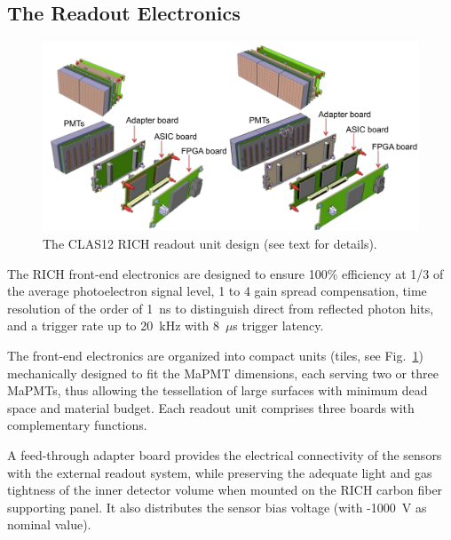 \documentclass[5p,times,twocolumn]{elsarticle}
\begin{document}
\subsection{The Readout Electronics}

\begin{figure}[t]
\begin{center}
\includegraphics[width=1.00\columnwidth]{TileAssembly.pdf}
\end{center}
\caption{The CLAS12 RICH readout unit design (see text for details).}
\label{fig:EleTile}
\end{figure}

The RICH front-end electronics are designed to ensure 100\% efficiency at 1/3 of the average photoelectron signal
level, 1 to 4 gain spread compensation, time resolution of the order of 1~ns to distinguish direct from reflected photon
hits, and a trigger rate up to 20~kHz with 8~$\mu$s trigger latency.

The front-end electronics are organized into compact units (tiles, see Fig.~\ref{fig:EleTile}) mechanically designed to
fit the MaPMT dimensions, each serving two or three MaPMTs, thus allowing the tessellation of large surfaces with
minimum dead space and material budget. Each readout unit comprises three boards with complementary functions.

A feed-through adapter board provides the electrical connectivity of the sensors with the external readout
system, while preserving the adequate light and gas tightness of the inner detector volume when mounted on the RICH
carbon fiber supporting panel. It also distributes the sensor bias voltage (with -1000~V as nominal value).
\end{document}
